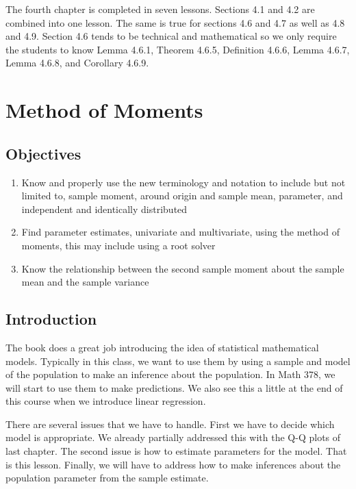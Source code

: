 \documentclass[]{book}
\providecommand{\tightlist}{%
  \setlength{\itemsep}{0pt}\setlength{\parskip}{0pt}}
\theoremstyle{definition}
\theoremstyle{definition}
\theoremstyle{definition}
\theoremstyle{remark}
\begin{document}
The fourth chapter is completed in seven lessons. Sections 4.1 and 4.2
are combined into one lesson. The same is true for sections 4.6 and 4.7
as well as 4.8 and 4.9. Section 4.6 tends to be technical and
mathematical so we only require the students to know Lemma 4.6.1,
Theorem 4.6.5, Definition 4.6.6, Lemma 4.6.7, Lemma 4.6.8, and Corollary
4.6.9.

\hypertarget{L18}{\section{Method of Moments}\label{L18}}

\subsection{Objectives}\label{objectives-17}

\begin{enumerate}
\def\labelenumi{\arabic{enumi}.}
\tightlist
\item
  Know and properly use the new terminology and notation to include but
  not limited to, sample moment, around origin and sample mean,
  parameter, and independent and identically distributed\\
\item
  Find parameter estimates, univariate and multivariate, using the
  method of moments, this may include using a root solver\\
\item
  Know the relationship between the second sample moment about the
  sample mean and the sample variance
\end{enumerate}

\subsection{Introduction}\label{introduction}

The book does a great job introducing the idea of statistical
mathematical models. Typically in this class, we want to use them by
using a sample and model of the population to make an inference about
the population. In Math 378, we will start to use them to make
predictions. We also see this a little at the end of this course when we
introduce linear regression.

There are several issues that we have to handle. First we have to decide
which model is appropriate. We already partially addressed this with the
Q-Q plots of last chapter. The second issue is how to estimate
parameters for the model. That is this lesson. Finally, we will have to
address how to make inferences about the population parameter from the
sample estimate.
\end{document}
